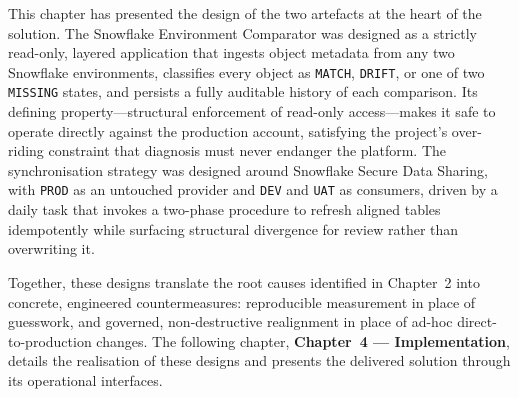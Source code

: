 This chapter has presented the design of the two artefacts at the heart of the solution. The Snowflake Environment Comparator was designed as a strictly read-only, layered application that ingests object metadata from any two Snowflake environments, classifies every object as \texttt{MATCH}, \texttt{DRIFT}, or one of two \texttt{MISSING} states, and persists a fully auditable history of each comparison. Its defining property---structural enforcement of read-only access---makes it safe to operate directly against the production account, satisfying the project's over-riding constraint that diagnosis must never endanger the platform. The synchronisation strategy was designed around Snowflake Secure Data Sharing, with \texttt{PROD} as an untouched provider and \texttt{DEV} and \texttt{UAT} as consumers, driven by a daily task that invokes a two-phase procedure to refresh aligned tables idempotently while surfacing structural divergence for review rather than overwriting it.

Together, these designs translate the root causes identified in Chapter~2 into concrete, engineered countermeasures: reproducible measurement in place of guesswork, and governed, non-destructive realignment in place of ad-hoc direct-to-production changes. The following chapter, \textbf{Chapter~4 --- Implementation}, details the realisation of these designs and presents the delivered solution through its operational interfaces.

\newpage
